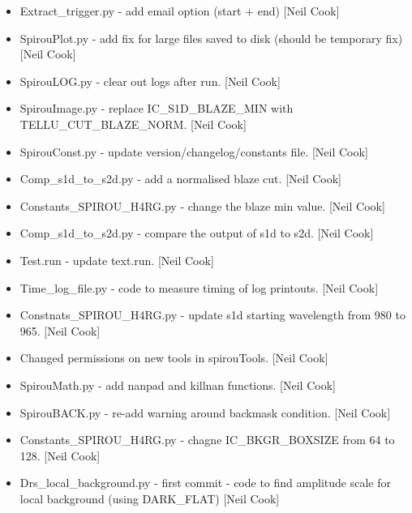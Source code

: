 \documentclass[a4paper,10pt,english]{report}
\begin{document}
\begin{itemize}
\item {} 
Extract\_trigger.py - add email option (start + end) {[}Neil Cook{]}

\item {} 
SpirouPlot.py - add fix for large files saved to disk (should be
temporary fix) {[}Neil Cook{]}

\item {} 
SpirouLOG.py - clear out logs after run. {[}Neil Cook{]}

\item {} 
SpirouImage.py - replace IC\_S1D\_BLAZE\_MIN with TELLU\_CUT\_BLAZE\_NORM.
{[}Neil Cook{]}

\item {} 
SpirouConst.py - update version/changelog/constants file. {[}Neil Cook{]}

\item {} 
Comp\_s1d\_to\_s2d.py - add a normalised blaze cut. {[}Neil Cook{]}

\item {} 
Constants\_SPIROU\_H4RG.py - change the blaze min value. {[}Neil Cook{]}

\item {} 
Comp\_s1d\_to\_s2d.py - compare the output of s1d to s2d. {[}Neil Cook{]}

\item {} 
Test.run - update text.run. {[}Neil Cook{]}

\item {} 
Time\_log\_file.py - code to measure timing of log printouts. {[}Neil
Cook{]}

\item {} 
Constnats\_SPIROU\_H4RG.py - update s1d starting wavelength from 980 to
965. {[}Neil Cook{]}

\item {} 
Changed permissions on new tools in spirouTools. {[}Neil Cook{]}

\item {} 
SpirouMath.py - add nanpad and killnan functions. {[}Neil Cook{]}

\item {} 
SpirouBACK.py - re-add warning around backmask condition. {[}Neil Cook{]}

\item {} 
Constants\_SPIROU\_H4RG.py - chagne IC\_BKGR\_BOXSIZE from 64 to 128.
{[}Neil Cook{]}

\item {} 
Drs\_local\_background.py - first commit - code to find amplitude scale
for local background (using DARK\_FLAT) {[}Neil Cook{]}


\end{itemize}
\end{document}
